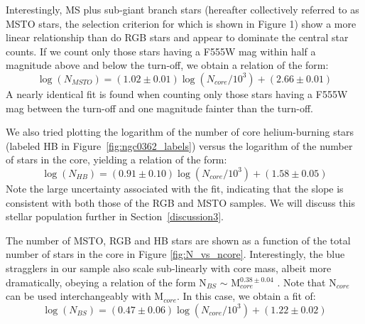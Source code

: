 Interestingly, MS plus sub-giant branch stars (hereafter
collectively referred to as MSTO stars, the selection criterion for
which is shown in Figure 1) show a more linear relationship than do RGB
stars and appear to dominate the central star counts.  If we count
only those stars having a F555W mag within half a magnitude above and
below the turn-off, we obtain a relation of the form:
\begin{equation}
\log (N_{MSTO}) = (1.02 \pm 0.01)\log (N_{core}/10^3) + (2.66 \pm 0.01)
\end{equation}
A nearly identical fit is found when counting only those
stars having a F555W mag between the turn-off and one
magnitude fainter than the turn-off. 

We also tried plotting the logarithm of the number of core
helium-burning stars (labeled HB in Figure~\ref{fig:ngc0362_labels})
versus the logarithm of the number of stars in the core, yielding a
relation of the form:
\begin{equation}
\log (N_{HB}) = (0.91 \pm 0.10)\log (N_{core}/10^3) + (1.58 \pm 
0.05)
\end{equation}   
Note the large uncertainty associated with the fit, indicating that
the slope is consistent with both those of the RGB and MSTO samples.
We will discuss this stellar population further in
Section~\ref{discussion3}.

The number of MSTO, RGB and HB stars are shown as a function of the
total number of stars in the core in Figure \ref{fig:N_vs_ncore}.
Interestingly, the blue stragglers in our sample also scale
sub-linearly with core mass, albeit more dramatically, obeying a
relation of the form N$_{BS}$ $\sim$ M$_{core}^{0.38 \pm 0.04}$
\citep{knigge09}.  Note that N$_{core}$ can be used interchangeably
with M$_{core}$.  In this case, we obtain a fit of:
\begin{equation}
\label{eqn:power-law-bs}
\log (N_{BS}) = (0.47 \pm 0.06)\log (N_{core}/10^3) + (1.22 \pm 0.02)
\end{equation}

